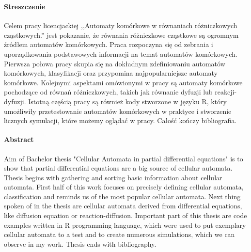 \documentclass[a4paper,12pt]{article}
\begin{document}
\newpage
\textbf{Streszczenie}\\\\
Celem pracy licencjackiej ,,Automaty komórkowe w równaniach różniczkowych cząstkowych.” jest pokazanie, że równania różniczkowe cząstkowe są ogromnym źródłem automatów komórkowych. Praca rozpoczyna się od zebrania i uporządkowania podstawowych informacji na temat automatów komórkowych. Pierwsza połowa pracy skupia się na dokładnym zdefiniowaniu automatów komórkowych, klasyfikacji oraz przypomina najpopularniejsze automaty komórkowe. Kolejnymi aspektami omówionymi w pracy są automaty komórkowe pochodzące od równań różniczkowych, takich jak równanie dyfuzji lub reakcji-dyfuzji. Istotną częścią pracy są również kody stworzone w języku R, który umożliwiły przetestowanie automatów komórkowych w praktyce i stworzenie licznych symulacji, które możemy oglądać w pracy. Całość kończy bibliografia. \\\\

\textbf{Abstract}\\\\
Aim of Bachelor thesis "Cellular Automata in partial differential equations" is to show that partial differential equations are a big source of cellular automata. Thesis begins with gathering and sorting basic information about cellular automata. First half of this work focuses on precisely defining cellular automata, classification and reminds us of the most popular cellular automata. Next thing spoken of in the thesis are cellular automata derived from differential equations, like diffusion equation or reaction-diffusion. Important part of this thesis are code examples written in R programming language, which were used to put exemplary cellular automata to a test and to create numerous simulations, which we can observe in my work. Thesis ends with bibliography.

\newpage
\tableofcontents
\newpage
\end{document}
